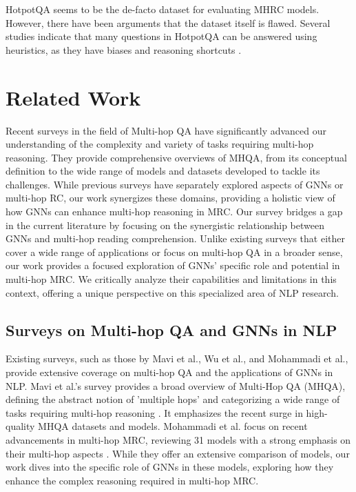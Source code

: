 \documentclass[sigplan,screen]{acmart}
\begin{document}
HotpotQA seems to be the de-facto dataset for evaluating MHRC models. However, there have been arguments that the dataset itself is flawed. 
Several studies \cite{RN176} \cite{RN175} \cite{RN154} \cite{RN150} indicate that many questions in HotpotQA can be answered using heuristics, 
as they have biases and reasoning shortcuts \cite{RN177}.



\section{Related Work}
Recent surveys in the field of Multi-hop QA have significantly advanced our understanding of the complexity and variety of tasks requiring multi-hop reasoning. 
They provide comprehensive overviews of MHQA, from its conceptual definition to the wide range of models and datasets developed to tackle its challenges. 
While previous surveys have separately explored aspects of GNNs or multi-hop RC, our work synergizes these domains, providing a holistic view of how GNNs can enhance multi-hop reasoning in MRC.
Our survey bridges a gap in the current literature by focusing on the synergistic relationship between GNNs and multi-hop reading comprehension. 
Unlike existing surveys that either cover a wide range of applications or focus on multi-hop QA in a broader sense, our work provides a focused 
exploration of GNNs' specific role and potential in multi-hop MRC. We critically analyze their capabilities and limitations in this context, 
offering a unique perspective on this specialized area of NLP research. 

\subsection{Surveys on Multi-hop QA and GNNs in NLP}
Existing surveys, such as those by Mavi et al., Wu et al., and Mohammadi et al., provide extensive coverage on multi-hop QA and the applications of GNNs in NLP. Mavi et al.'s survey provides a 
broad overview of Multi-Hop QA (MHQA), defining the abstract notion of 'multiple hops' and categorizing a wide range of tasks requiring multi-hop reasoning \cite{RN165}. It emphasizes the recent 
surge in high-quality MHQA datasets and models. Mohammadi et al. focus on recent advancements in multi-hop MRC, reviewing 31 models with a strong emphasis on their multi-hop aspects \cite{RN80}. 
While they offer an extensive comparison of models, our work dives into the specific role of GNNs in these models, exploring how they enhance the complex reasoning required in multi-hop MRC.
\end{document}
